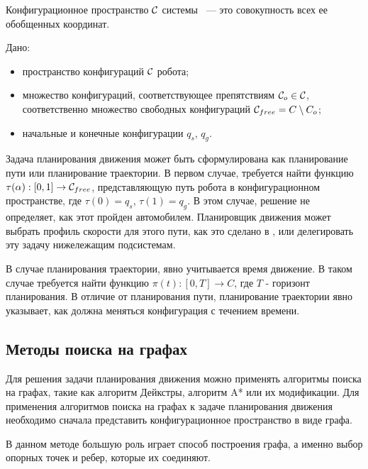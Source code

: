 Конфигурационное пространство $\mathcal{C}$ системы ~--- это совокупность всех ее обобщенных координат.

Дано:
\begin{itemize}
    \item пространство конфигураций $\mathcal{C}$ робота;
    \item множество конфигураций, соответствующее препятствиям $\mathcal{C}_o \in \mathcal{C}$, соответственно
          множество свободных конфигураций $\mathcal{C}_{free} = C \setminus C_o$;
    \item начальные и конечные конфигурации $q_s$, $q_g$.
\end{itemize}

Задача планирования движения может быть сформулирована как планирование пути или планирование траектории.
В первом случае, требуется найти функцию $\tau(\alpha): [0,1] \rightarrow \mathcal{C}_{free}$, представляющую путь робота в
конфигурационном пространстве, где $\tau(0)=q_s$, $\tau(1)=q_g$. В этом случае, решение не определяет, как этот пройден
автомобилем. Планировщик движения может выбрать профиль скорости для этого пути, как это сделано в \cite{darpa_boss},
или делегировать эту задачу нижележащим подсистемам.

В случае планирования траектории, явно учитывается время движение. В таком случае требуется найти функцию
$\pi(t) : [0, T] \rightarrow C$, где $T$ - горизонт планирования. В отличие от планирования пути, планирование
траектории явно указывает, как должна меняться конфигурация с течением времени.

\subsection{Методы поиска на графах}
Для решения задачи планирования движения можно применять алгоритмы поиска на графах, такие как
алгоритм Дейкстры, алгоритм A* или их модификации. Для применения алгоритмов поиска на графах к задаче
планирования движения необходимо сначала представить конфигурационное пространство в виде графа.

В данном методе большую роль играет способ построения графа, а именно выбор опорных точек и ребер,
которые их соединяют.

